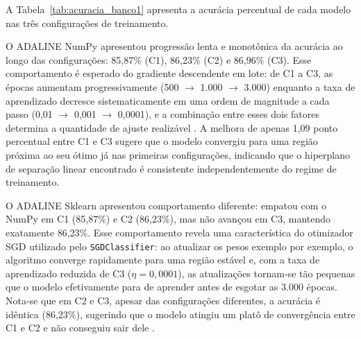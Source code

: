 A Tabela~\ref{tab:acuracia_banco1} apresenta a acurácia percentual de cada modelo nas três configurações de treinamento.

\begin{table}[H]
\centering
\caption{Acurácia (\%) dos modelos no Banco 1 por configuração de treinamento.}
\label{tab:acuracia_banco1}
\end{table}

O ADALINE NumPy apresentou progressão lenta e monotônica da acurácia ao longo das configurações: 85,87\% (C1), 86,23\% (C2) e 86,96\% (C3). Esse comportamento é esperado do gradiente descendente em lote: de C1 a C3, as épocas aumentam progressivamente (500 $\to$ 1.000 $\to$ 3.000) enquanto a taxa de aprendizado decresce sistematicamente em uma ordem de magnitude a cada passo (0,01 $\to$ 0,001 $\to$ 0,0001), e a combinação entre esses dois fatores determina a quantidade de ajuste realizável \cite{silva2016}. A melhora de apenas 1,09 ponto percentual entre C1 e C3 sugere que o modelo convergiu para uma região próxima ao seu ótimo já nas primeiras configurações, indicando que o hiperplano de separação linear encontrado é consistente independentemente do regime de treinamento.

O ADALINE Sklearn apresentou comportamento diferente: empatou com o NumPy em C1 (85,87\%) e C2 (86,23\%), mas não avançou em C3, mantendo exatamente 86,23\%. Esse comportamento revela uma característica do otimizador SGD utilizado pelo \texttt{SGDClassifier}: ao atualizar os pesos exemplo por exemplo, o algoritmo converge rapidamente para uma região estável e, com a taxa de aprendizado reduzida de C3 ($\eta=0{,}0001$), as atualizações tornam-se tão pequenas que o modelo efetivamente para de aprender antes de esgotar as 3.000 épocas. Nota-se que em C2 e C3, apesar das configurações diferentes, a acurácia é idêntica (86,23\%), sugerindo que o modelo atingiu um platô de convergência entre C1 e C2 e não conseguiu sair dele \cite{pedregosa2011}.

